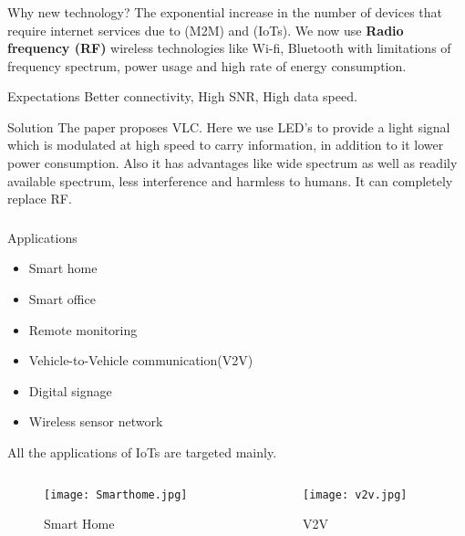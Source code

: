 \documentclass{beamer}
\begin{document}
\begin{frame}
  \frametitle{}
  \begin{block}{Why new technology?}
  The exponential increase in the number of devices that require internet services due to (M2M) and (IoTs). We now use \textbf{Radio frequency (RF)} wireless technologies like Wi-fi, Bluetooth with limitations of frequency spectrum, power usage and high rate of energy consumption. 
  \end{block}
  \begin{block}{Expectations}
  Better connectivity, High SNR, High data speed.
  \end{block}
  \begin{block}{Solution}
  The paper proposes VLC. Here we use LED’s to provide a light signal which is modulated at high speed to carry information, in addition to it lower power consumption. Also it has advantages like wide spectrum as well as readily available spectrum, less interference and harmless to humans. It can completely replace RF.
  \end{block}
\end{frame}

\begin{frame}
  \frametitle{}
  \begin{block}{Applications}
  \begin{itemize}
      \item Smart home
      \item Smart office
      \item Remote monitoring
      \item Vehicle-to-Vehicle communication(V2V)
      \item Digital signage
      \item Wireless sensor network
      \end{itemize}
      All the applications of IoTs are targeted mainly.
  \end{block}
\begin{columns}
	\begin{column}{0.48\textwidth}
		\begin{figure}[h]
    \texttt{[image: Smarthome.jpg]}
    \caption{Smart Home}
        \end{figure}
	\end{column}
	\begin{column}{0.48\textwidth}
	\begin{figure} [h]
    \texttt{[image: v2v.jpg]}
    \caption{V2V}
    \end{figure}	
	\end{column}
\end{columns}
\end{frame}
\end{document}
